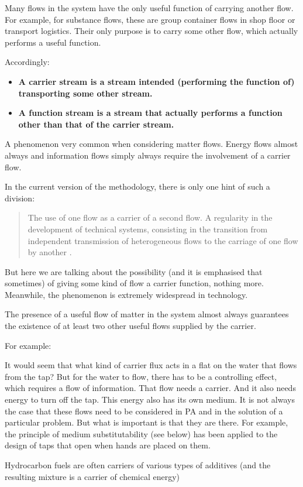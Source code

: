 \documentclass[a4paper,11pt]{article}
\begin{document}
Many flows in the system have the only useful function of carrying another
flow. For example, for substance flows, these are group container flows in
shop floor or transport logistics. Their only purpose is to carry some other
flow, which actually performs a useful function.

Accordingly:
\begin{itemize}
\item \textbf{A carrier stream is a stream intended (performing the function
  of) transporting some other stream.}
\item \textbf{A function stream is a stream that actually performs a function
  other than that of the carrier stream.}
\end{itemize}
A phenomenon very common when considering matter flows. Energy flows almost
always and information flows simply always require the involvement of a
carrier flow.

In the current version of the methodology, there is only one hint of such a
division:
\begin{quote}
  The use of one flow as a carrier of a second flow. A regularity in the
  development of technical systems, consisting in the transition from
  independent transmission of heterogeneous flows to the carriage of one flow
  by another \cite{B6}.
\end{quote}

But here we are talking about the possibility (and it is emphasised that
sometimes) of giving some kind of flow a carrier function, nothing more.
Meanwhile, the phenomenon is extremely widespread in technology.

The presence of a useful flow of matter in the system almost always guarantees
the existence of at least two other useful flows supplied by the carrier.

For example:

It would seem that what kind of carrier flux acts in a flat on the water that
flows from the tap? But for the water to flow, there has to be a controlling
effect, which requires a flow of information. That flow needs a carrier. And
it also needs energy to turn off the tap. This energy also has its own medium.
It is not always the case that these flows need to be considered in PA and in
the solution of a particular problem. But what is important is that they are
there. For example, the principle of medium substitutability (see below) has
been applied to the design of taps that open when hands are placed on them.

Hydrocarbon fuels are often carriers of various types of additives (and the
resulting mixture is a carrier of chemical energy)
\end{document}
